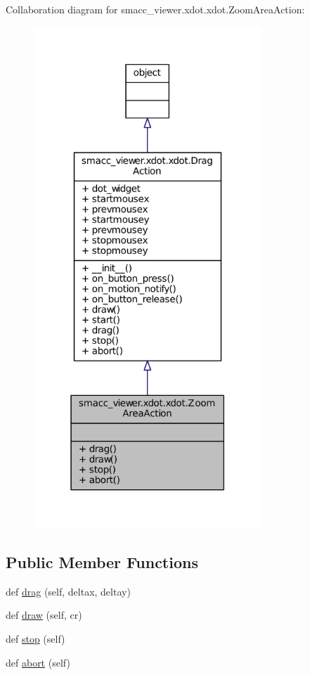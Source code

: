 Collaboration diagram for smacc\+\_\+viewer.\+xdot.\+xdot.\+Zoom\+Area\+Action\+:
\nopagebreak
\begin{figure}[H]
\begin{center}
\leavevmode
\includegraphics[width=243pt]{classsmacc__viewer_1_1xdot_1_1xdot_1_1ZoomAreaAction__coll__graph}
\end{center}
\end{figure}
\subsection*{Public Member Functions}
\begin{DoxyCompactItemize}
\item 
def \hyperlink{classsmacc__viewer_1_1xdot_1_1xdot_1_1ZoomAreaAction_a7ea4a94d2806aeac007583322117939f}{drag} (self, deltax, deltay)
\item 
def \hyperlink{classsmacc__viewer_1_1xdot_1_1xdot_1_1ZoomAreaAction_aa95e76a700ac17e12721adb423ef5b1d}{draw} (self, cr)
\item 
def \hyperlink{classsmacc__viewer_1_1xdot_1_1xdot_1_1ZoomAreaAction_a2d7dbbc17fbc5ba4f32fa36242cb0005}{stop} (self)
\item 
def \hyperlink{classsmacc__viewer_1_1xdot_1_1xdot_1_1ZoomAreaAction_a53c8125d86777bf1e355780995ba8a8a}{abort} (self)
\end{DoxyCompactItemize}
